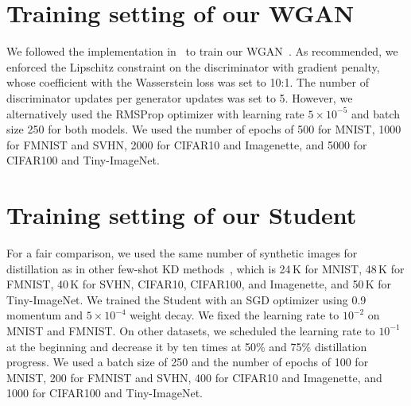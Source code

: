 \section{Training setting of our WGAN} \label{sec:supp-training-wgan}
\begin{foldable}
  We followed the implementation in~\cite{gulrajani2017improved} to train our WGAN~\cite{arjovsky2017wasserstein}.
  As recommended, we enforced the Lipschitz constraint on the discriminator with gradient penalty, whose coefficient with the Wasserstein loss was set to 10:1.
  The number of discriminator updates per generator updates was set to 5.
  However, we alternatively used the RMSProp optimizer with learning rate $5 \times 10^{-5}$ and batch size 250 for both models.
  We used the number of epochs of 500 for MNIST, 1000 for FMNIST and SVHN, 2000 for CIFAR10 and Imagenette, and 5000 for CIFAR100 and Tiny-ImageNet.
\end{foldable}

\section{Training setting of our Student} \label{sec:supp-training-student}
\begin{foldable}
  For a fair comparison, we used the same number of synthetic images for distillation as in other few-shot KD methods~\cite{kimura2018few,wang2020neural,nguyen2022black}, which is 24\,K for MNIST, 48\,K for FMNIST, 40\,K for SVHN, CIFAR10, CIFAR100, and Imagenette, and 50\,K for Tiny-ImageNet.
  We trained the Student with an SGD optimizer using 0.9 momentum and $5 \times 10^{-4}$ weight decay.
  We fixed the learning rate to $10^{-2}$ on MNIST and FMNIST.
  On other datasets, we scheduled the learning rate to $10^{-1}$ at the beginning and decrease it by ten times at 50\% and 75\% distillation progress.
  We used a batch size of 250 and the number of epochs of 100 for MNIST, 200 for FMNIST and SVHN, 400 for CIFAR10 and Imagenette, and 1000 for CIFAR100 and Tiny-ImageNet.
\end{foldable}
